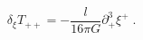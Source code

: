 \begin{equation}
\delta _{\xi }T_{++}=-\frac{l}{16\pi G}\partial _{+}^{3}\xi ^{+}\;.
\label{DeltaTmnBY}
\end{equation}

